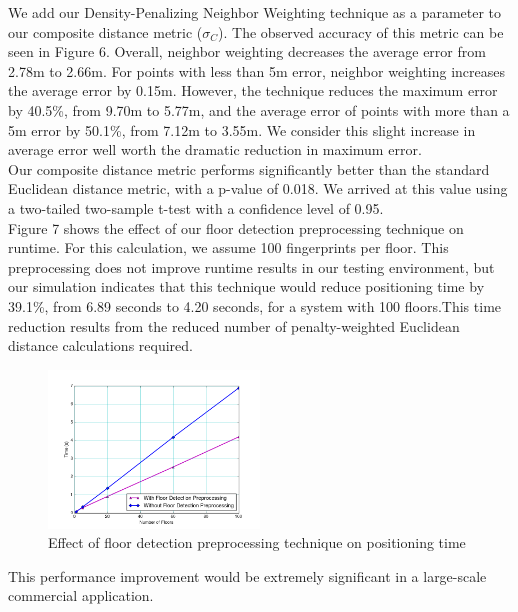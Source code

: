 \documentclass[conference]{IEEEtran}
\begin{document}
We add our Density-Penalizing Neighbor Weighting technique as a parameter to our composite distance metric ($\sigma_C$). The observed accuracy of this metric can be seen in Figure 6. Overall, neighbor weighting decreases the average error from 2.78m to 2.66m. For points with less than 5m error, neighbor weighting increases the average error by 0.15m. However, the technique reduces the maximum error by 40.5\%, from 9.70m to 5.77m, and the average error of points with more than a 5m error by 50.1\%, from 7.12m to 3.55m. We consider this slight increase in average error well worth the dramatic reduction in maximum error. \\
\indent Our composite distance metric performs significantly better than the standard Euclidean distance metric, with a p-value of 0.018. We arrived at this value using a two-tailed two-sample t-test with a confidence level of 0.95.  \\		
\indent Figure 7 shows the effect of our floor detection preprocessing technique on runtime. For this calculation, we assume 100 fingerprints per floor. This preprocessing does not improve runtime results in our testing environment, but our simulation indicates that this technique would reduce positioning time by 39.1\%, from 6.89 seconds to 4.20 seconds, for a system with 100 floors.This time reduction results from the reduced number of penalty-weighted Euclidean distance calculations required.


\begin{figure}[h!]
  \centering
    \includegraphics[width=0.5\textwidth]{time_comparison.png}
   \caption{Effect of floor detection preprocessing technique on positioning time}
\end{figure}

This performance improvement would be extremely significant in a large-scale commercial application.
\end{document}
